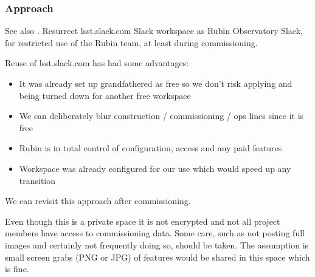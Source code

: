 \subsubsection{Approach}
See also .
Resurrect lsst.slack.com Slack workspace as Rubin Observatory Slack, for restricted use of the Rubin team, at least during commissioning.

Reuse of lsst.slack.com has had some advantages:

\begin{itemize}
\item  It was already set up grandfathered as free so we don't risk applying and being turned down for another free workspace
\item  We can deliberately blur construction / commissioning / ops lines since it is free
\item  Rubin is in total control of configuration, access and any paid features
\item  Workspace was already configured for our use which would speed up any transition

\end{itemize}
We can revisit this approach after commissioning.

Even though this is a private space it is not encrypted and not all project members have access to commissioning data.
Some care, such as not posting full images and certainly not frequently doing so, should be taken.
The assumption is small screen grabs (PNG or JPG)  of features would be shared in this space which is fine.
